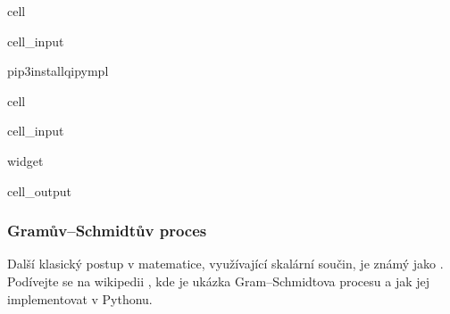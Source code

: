 \documentclass[letterpaper,10pt,english]{jupyterBook}
\begin{document}
\begin{sphinxuseclass}{cell}\begin{sphinxVerbatimInput}

\begin{sphinxuseclass}{cell_input}
\begin{sphinxVerbatim}[commandchars=\\\{\}]
pip3install\PYGZhy{}qipympl
\end{sphinxVerbatim}

\end{sphinxuseclass}\end{sphinxVerbatimInput}

\end{sphinxuseclass}
\begin{sphinxuseclass}{cell}\begin{sphinxVerbatimInput}

\begin{sphinxuseclass}{cell_input}
\begin{sphinxVerbatim}[commandchars=\\\{\}]
 widget  

\PYG{p}{[}\PYG{p}{]}    
\end{sphinxVerbatim}

\end{sphinxuseclass}\end{sphinxVerbatimInput}
\begin{sphinxVerbatimOutput}

\begin{sphinxuseclass}{cell_output}
\noindent{}

\end{sphinxuseclass}\end{sphinxVerbatimOutput}

\end{sphinxuseclass}

\subsubsection{Gramův–Schmidtův proces}
\label{\detokenize{Prednasky/0_3_Sou_u0159adnicov_xe9_syst_xe9my:gramuvschmidtuv-proces}}
\sphinxAtStartPar
Další klasický postup v matematice, využívající skalární součin, je známý jako . Podívejte se na wikipedii , kde je ukázka Gram–Schmidtova procesu a jak jej implementovat v Pythonu.
\end{document}
